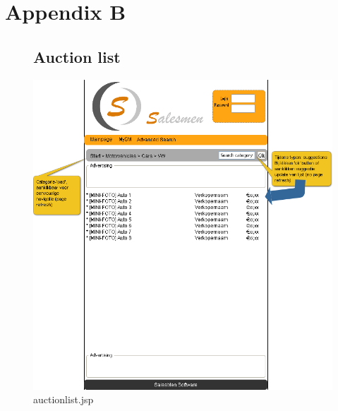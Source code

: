 \documentclass[a4paper, 12pt]{report}
\begin{document}
\chapter{Appendix B}
\begin{figure}
\section{Auction list}
\label{fig_prototype_auctionlist}
\includegraphics[width=15cm]{../../img/SM_auction_list.png}
\caption{auctionlist.jsp}
\end{figure}
\end{document}
